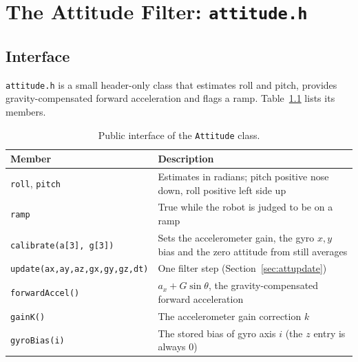 \documentclass[11pt,a4paper]{report}
\newcommand{\code}[1]{\texttt{#1}}
\begin{document}
\chapter[Attitude Filter]{The Attitude Filter: \texttt{attitude.h}}\label{ch:att}

\section{Interface}
\code{attitude.h} is a small header-only class that estimates roll and pitch, provides gravity-compensated forward acceleration and flags a ramp. Table~\ref{tab:attif} lists its members.

\begin{table}[H]
\centering
\caption{Public interface of the \code{Attitude} class.}\label{tab:attif}
\small
\begin{tabular}{@{}lp{9.8cm}@{}}
\toprule
Member & Description\\
\midrule
\code{roll}, \code{pitch} & Estimates in radians; pitch positive nose down, roll positive left side up\\
\code{ramp} & True while the robot is judged to be on a ramp\\
\code{calibrate(a[3], g[3])} & Sets the accelerometer gain, the gyro $x,y$ bias and the zero attitude from still averages\\
\code{update(ax,ay,az,gx,gy,gz,dt)} & One filter step (Section~\ref{sec:attupdate})\\
\code{forwardAccel()} & $a_x+G\sin\theta$, the gravity-compensated forward acceleration\\
\code{gainK()} & The accelerometer gain correction $k$\\
\code{gyroBias(i)} & The stored bias of gyro axis $i$ (the $z$ entry is always 0)\\
\bottomrule
\end{tabular}
\end{table}
\end{document}
